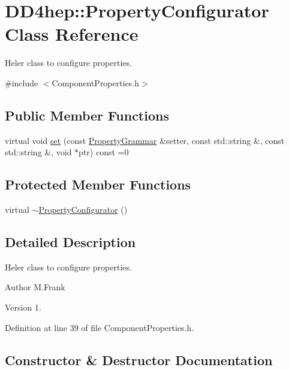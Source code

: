 \hypertarget{class_d_d4hep_1_1_property_configurator}{}\section{D\+D4hep\+:\+:Property\+Configurator Class Reference}
\label{class_d_d4hep_1_1_property_configurator}


Heler class to configure properties.  




{\ttfamily \#include $<$Component\+Properties.\+h$>$}

\subsection*{Public Member Functions}
\begin{DoxyCompactItemize}
\item 
virtual void \hyperlink{class_d_d4hep_1_1_property_configurator_a863dbbfed205e1a74c7e81dd1375843f}{set} (const \hyperlink{class_d_d4hep_1_1_property_grammar}{Property\+Grammar} \&setter, const std\+::string \&, const std\+::string \&, void $\ast$ptr) const =0
\end{DoxyCompactItemize}
\subsection*{Protected Member Functions}
\begin{DoxyCompactItemize}
\item 
virtual \hyperlink{class_d_d4hep_1_1_property_configurator_ab634d5cb9b04f998d49465b8fb5aa507}{$\sim$\+Property\+Configurator} ()
\end{DoxyCompactItemize}


\subsection{Detailed Description}
Heler class to configure properties. 

\begin{DoxyAuthor}{Author}
M.\+Frank 
\end{DoxyAuthor}
\begin{DoxyVersion}{Version}
1. 
\end{DoxyVersion}


Definition at line 39 of file Component\+Properties.\+h.



\subsection{Constructor \& Destructor Documentation}
\hypertarget{class_d_d4hep_1_1_property_configurator_ab634d5cb9b04f998d49465b8fb5aa507}{}\label{class_d_d4hep_1_1_property_configurator_ab634d5cb9b04f998d49465b8fb5aa507} 
